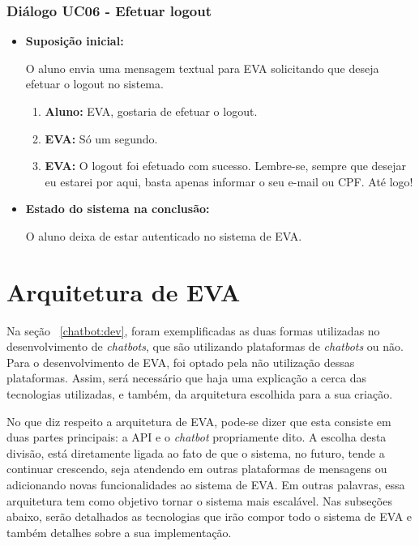 \subsubsection{Diálogo UC06 - Efetuar logout}

\begin{itemize}
    \item \textbf{Suposição inicial:}
    
        O aluno envia uma mensagem textual para EVA solicitando que deseja efetuar o logout no sistema.
        
        \begin{enumerate}
            \item \textbf{Aluno:} EVA, gostaria de efetuar o logout.
            \item \textbf{EVA:} Só um segundo.
            \item \textbf{EVA:} O logout foi efetuado com sucesso. Lembre-se, sempre que desejar eu estarei por aqui, basta apenas informar o seu e-mail ou CPF. Até logo!
        \end{enumerate}
    
    \item \textbf{Estado do sistema na conclusão:}
    
        O aluno deixa de estar autenticado no sistema de EVA.
\end{itemize}


\section{Arquitetura de EVA}

Na seção ~\ref{chatbot:dev}, foram exemplificadas as duas formas utilizadas no desenvolvimento de \textit{chatbots}, que são utilizando plataformas de \textit{chatbots} ou não. Para o desenvolvimento de EVA, foi optado pela não utilização dessas plataformas. Assim, será necessário que haja uma explicação a cerca das tecnologias utilizadas, e também, da arquitetura escolhida para a sua criação.

No que diz respeito a arquitetura de EVA, pode-se dizer que esta consiste em duas partes principais: a API e o \textit{chatbot} propriamente dito. A escolha desta divisão, está diretamente ligada ao fato de que o sistema, no futuro, tende a continuar crescendo, seja atendendo em outras plataformas de mensagens ou adicionando novas funcionalidades ao sistema de EVA. Em outras palavras, essa arquitetura tem como objetivo tornar o sistema mais escalável. Nas subseções abaixo, serão detalhados as tecnologias que irão compor todo o sistema de EVA e também detalhes sobre a sua implementação.

